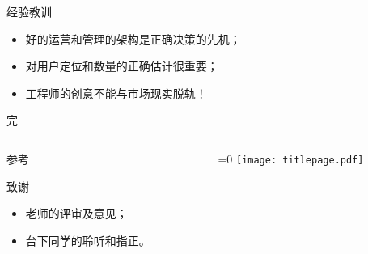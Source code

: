 \documentclass[handout]{ctexbeamer}
\begin{document}
\begin{frame}{经验教训}
	\begin{itemize}
		\pause
	\item 好的运营和管理的架构是正确决策的先机；
		\pause
	\item 对用户定位和数量的正确估计很重要；
		\pause
	\item \alert{工程师的创意不能与市场现实脱轨！}
\end{itemize}
\end{frame}

\begin{frame}{完}
	\begin{columns}
		\begin{column}{.7\textwidth}
			\begin{block}{参考}
				
				
			\end{block}

			\begin{block}{致谢}
				\begin{itemize}
					\item 老师的评审及意见；
					\item 台下同学的聆听和指正。
				\end{itemize}
			\end{block}
		\end{column}
		\begin{column}{.3\textwidth}
			\centering
			\ifnum{}=0
				\else
					\texttt{[image: titlepage.pdf]}
				\fi
			\end{column}
		\end{columns}
	\end{frame}

	
\end{document}
